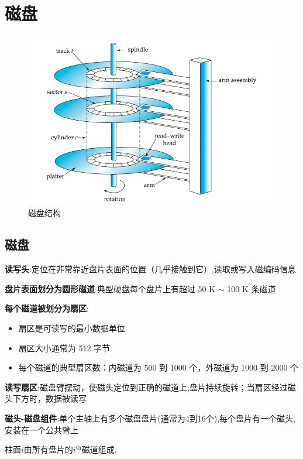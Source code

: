 \section{磁盘}

\begin{figure}[H]
    \centering
    \includegraphics[width=0.9\linewidth]{image3.png}
    \caption{磁盘结构}
    \label{}
\end{figure}

\subsection{磁盘}

\noindent\textbf{读写头}:定位在非常靠近盘片表面的位置（几乎接触到它）,读取或写入磁编码信息

\noindent\textbf{盘片表面划分为圆形磁道}:典型硬盘每个盘片上有超过 50 K $\sim$ 100 K 条磁道

\noindent\textbf{每个磁道被划分为扇区}:

\begin{itemize}
    \item 扇区是可读写的最小数据单位
    \item 扇区大小通常为 512 字节
    \item 每个磁道的典型扇区数：内磁道为 500 到 1000 个，外磁道为 1000 到 2000 个
\end{itemize}

\noindent\textbf{读写扇区}:磁盘臂摆动，使磁头定位到正确的磁道上;盘片持续旋转；当扇区经过磁头下方时，数据被读写

\noindent\textbf{磁头-磁盘组件}:单个主轴上有多个磁盘盘片(通常为4到16个),每个盘片有一个磁头,安装在一个公共臂上

\noindent 柱面$i$由所有盘片的$i^{\text{th}}$磁道组成.

